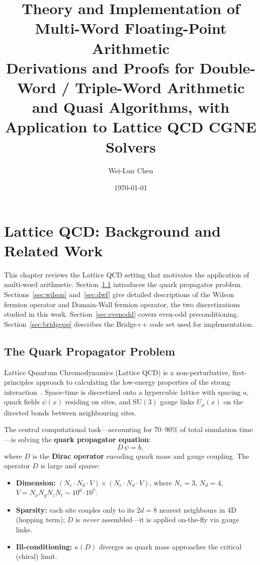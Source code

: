 \documentclass[12pt,a4paper]{article}
\title{
  \LARGE \textbf{Theory and Implementation of Multi-Word Floating-Point Arithmetic} \\[0.5em]
  \large Derivations and Proofs for Double-Word / Triple-Word Arithmetic \\
  and Quasi Algorithms, with Application to Lattice QCD CGNE Solvers
}
\author[1]{Wei-Lun Chen \orcidlink{0000-0002-8542-9126}}
\affil[1]{Advancesoft, 17F West, Shin-Ochanomizu Bldg., 4-3, Kanda-Surugadai, Chiyoda-ku, Tokyo 101-0062, Japan \authorcr \textit{chen.weilun@advancesoft.jp}}
\date{\today}
\begin{document}
\maketitle
\tableofcontents
\newpage


\section{Lattice QCD: Background and Related Work}
\label{sec:lqcd}

This chapter reviews the Lattice QCD setting that motivates the application
of multi-word arithmetic.
Section~\ref{sec:quark} introduces the quark propagator problem.
Sections~\ref{sec:wilson} and~\ref{sec:dwf} give detailed descriptions of the
Wilson fermion operator and Domain-Wall fermion operator, the two discretizations
studied in this work.
Section~\ref{sec:evenodd} covers even-odd preconditioning.
Section~\ref{sec:bridgepp} describes the Bridge++ code set used for implementation.

\subsection{The Quark Propagator Problem}
\label{sec:quark}

Lattice Quantum Chromodynamics (Lattice QCD) is a non-perturbative,
first-principles approach to calculating the low-energy properties of
the strong interaction~\cite{Wilson1974}.
Space-time is discretized onto a hypercubic lattice with spacing $a$,
quark fields $\psi(x)$ residing on sites, and $\mathrm{SU}(3)$ gauge
links $U_\mu(x)$ on the directed bonds between neighbouring sites.

The central computational task---accounting for 70--90\% of total simulation
time---is solving the \textbf{quark propagator equation}:
\begin{equation}
  D\,\psi = b,
  \label{eq:quark_eq}
\end{equation}
where $D$ is the \textbf{Dirac operator} encoding quark mass and gauge coupling.
The operator $D$ is large and sparse:
\begin{itemize}
  \item \textbf{Dimension:} $(N_c \cdot N_d \cdot V) \times (N_c \cdot N_d \cdot V)$,
        where $N_c = 3$, $N_d = 4$, $V = N_x N_y N_z N_t \sim 10^6$--$10^7$.
  \item \textbf{Sparsity:} each site couples only to its $2d = 8$ nearest
        neighbours in 4D (hopping term); $D$ is \emph{never} assembled---it
        is applied on-the-fly via gauge links.
  \item \textbf{Ill-conditioning:} $\kappa(D)$ diverges as quark mass approaches
        the critical (chiral) limit.
\end{itemize}
\end{document}
